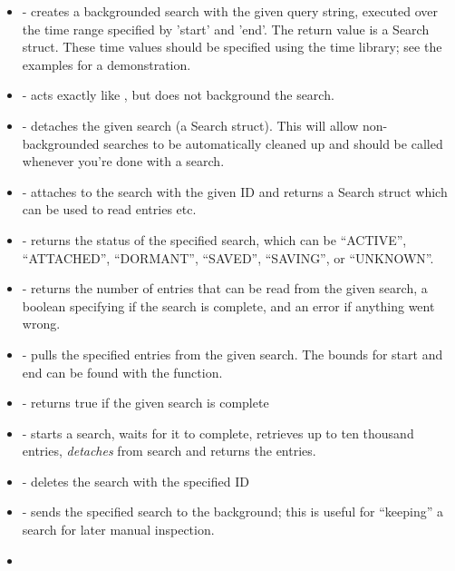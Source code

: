 \begin{itemize}
\tightlist
\item
   - creates
  a backgrounded search with the given query string, executed over the
  time range specified by 'start' and 'end'. The return value is a
  Search struct. These time values should be specified using the time
  library; see the examples for a demonstration.
\item
   - acts exactly like
  , but does not background the search.
\item
   - detaches the given search (a Search
  struct). This will allow non-backgrounded searches to be automatically
  cleaned up and should be called whenever you're done with a search.
\item
   - attaches to the search
  with the given ID and returns a Search struct which can be used to
  read entries etc.
\item
   - returns the status of
  the specified search, which can be ``ACTIVE'', ``ATTACHED'', ``DORMANT'', ``SAVED'', ``SAVING'', or ``UNKNOWN''.
\item
   - returns
  the number of entries that can be read from the given search, a
  boolean specifying if the search is complete, and an error if anything
  went wrong.
\item
   - pulls
  the specified entries from the given search. The bounds for start and
  end can be found with the  function.
\item
   - returns true if the
  given search is complete
\item
   -
  starts a search, waits for it to complete, retrieves up to ten
  thousand entries, \emph{detaches} from search and returns the entries.
\item
   - deletes the search with the
  specified ID
\item
   - sends the specified search to
  the background; this is useful for ``keeping'' a search for later manual
  inspection.
\item

\end{itemize}
